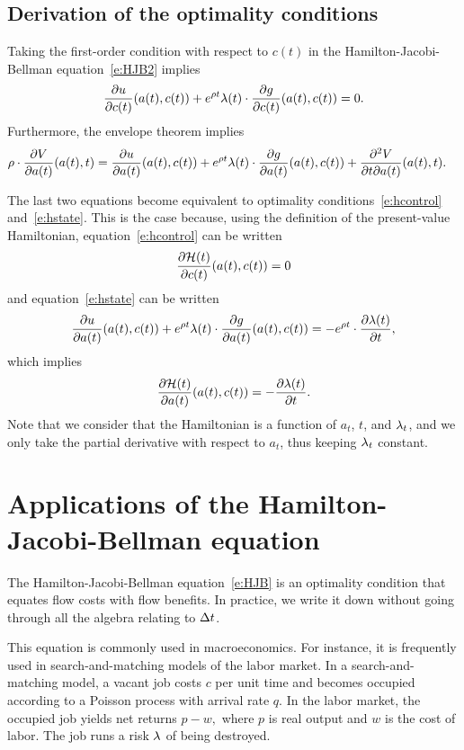 \documentclass[letterpaper, 11pt, leqno]{article}
\begin{document}
\subsection{Derivation of the optimality conditions}

Taking the first-order condition with respect to $c(t)$ in the Hamilton-Jacobi-Bellman equation~\eqref{e:HJB2} implies
\begin{equation*}
\pd{u}{c(t)}(a(t),c(t))+e^{\r t} \l(t) \cdot \pd{g}{c(t)}(a(t),c(t))=0.
\end{equation*}
Furthermore, the envelope theorem implies
\begin{align*}
\r \cdot \pd{V}{a(t)}(a(t),t)&=\pd{u}{a(t)}(a(t),c(t))+e^{\r t}\l(t)\cdot \pd{g}{a(t)}(a(t),c(t))+\frac{\partial^{2}V}{\partial t\partial a(t)}(a(t),t).
\end{align*}

The last two equations become equivalent to optimality conditions~\eqref{e:hcontrol} and~\eqref{e:hstate}. This is the case because, using the definition of the present-value Hamiltonian, equation~\eqref{e:hcontrol} can be written
\begin{equation*}
\pd{\Hc(t)}{c(t)}(a(t),c(t)) =0
\end{equation*}
and equation~\eqref{e:hstate} can be written
\begin{equation*}
\pd{u}{a(t)}(a(t),c(t)) +e^{\r  t}  \l(t)\cdot \pd{g}{a(t)}(a(t),c(t))=-e^{\r t} \cdot\pd{\l(t)}{t},
\end{equation*}
which implies
\begin{equation*}
\pd{\Hc(t)}{a(t)}(a(t),c(t)) =-\pd{\l(t)}{t}.
\end{equation*}
Note that we consider that the Hamiltonian is a function of $a_{t}$, $t$, and $\lambda_{t}$, and we only take the partial derivative with respect to $a_{t}$, thus keeping $\lambda_{t}$ constant.

\section{Applications of the Hamilton-Jacobi-Bellman equation}

The Hamilton-Jacobi-Bellman equation~\eqref{e:HJB} is an optimality condition that equates flow costs with flow benefits. In practice, we write it down without going through all the algebra relating to $\Delta t$. 

This equation is commonly used in macroeconomics. For instance, it is frequently used in search-and-matching models of the labor market. In a search-and-matching model, a vacant job costs $c$ per unit time and becomes occupied according to a Poisson process with arrival rate $q.$ In the labor market, the occupied job yields net returns $p-w,$ where $p$ is real output and $w$ is the cost of labor. The job runs a risk $\lambda$ of being destroyed. 
\end{document}
